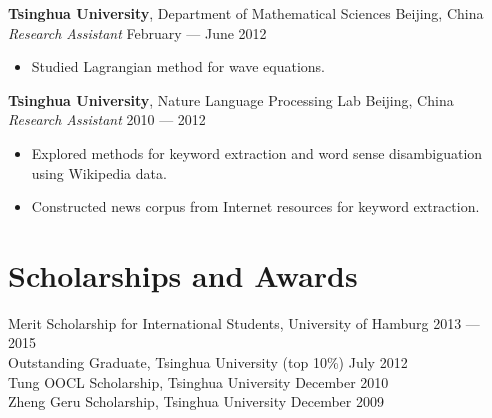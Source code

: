 \documentclass[a4paper,9pt]{article} %
\begin{document}

\textbf{Tsinghua University}, Department of Mathematical Sciences \hfill Beijing, China \\
\textit{Research Assistant} \hfill February --- June 2012
\vspace{-\parskip}
\begin{itemize}
  \item Studied Lagrangian method for wave equations.
\end{itemize}


\textbf{Tsinghua University}, Nature Language Processing Lab \hfill Beijing, China \\
\textit{Research Assistant} \hfill 2010 --- 2012
\vspace{-\parskip}
\begin{itemize}
  \item Explored methods for keyword extraction and word sense disambiguation using Wikipedia data.
  \item Constructed news corpus from Internet resources for keyword extraction.
\end{itemize}


\section{Scholarships and Awards}

Merit Scholarship for International Students, University of Hamburg \hfill 2013 --- 2015 \\
Outstanding Graduate, Tsinghua University (top 10\%) \hfill July 2012 \\
Tung OOCL Scholarship, Tsinghua University \hfill December 2010  \\
Zheng Geru Scholarship, Tsinghua University \hfill December 2009

\fi

\end{document}
